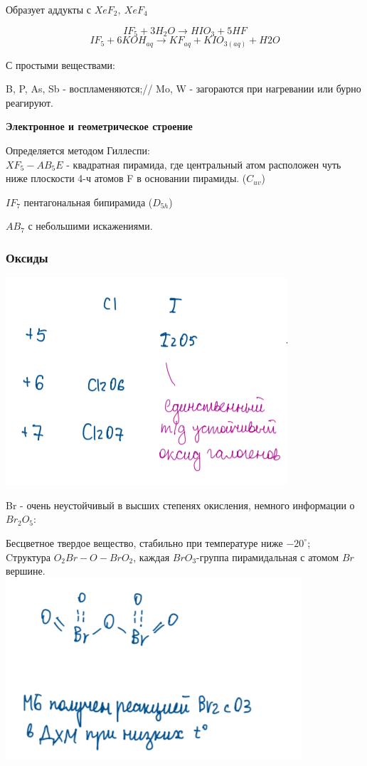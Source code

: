Образует аддукты с $XeF_2,\ XeF_4$

$$IF_5 + 3H_2O \rightarrow HIO_3 + 5HF$$
$$IF_5 + 6KOH_{aq}\rightarrow KF_{aq}+ KIO_{3(aq)} + H2O$$

С простыми веществами:

B, P, As, Sb - воспламеняются;//
Mo, W - загораются при нагревании или бурно реагируют.

\textbf{Электронное и геометрическое строение}

Определяется методом Гиллеспи:\\

$XF_5 - AB_5E$ - квадратная пирамида, где центральный атом расположен чуть ниже плоскости 4-ч атомов F в основании пирамиды. ($C_{uv}$)

$IF_7$ пентагональная бипирамида ($D_{5h}$)

$AB_7$ с небольшими искажениями.

\subsubsection*{Оксиды}
\includegraphics{images/5v1.png}

Br - очень неустойчивый в высших степенях окисления, немного информации о $Br_2O_5$:

Бесцветное твердое вещество, стабильно при температуре ниже $-20^{\circ}$;\\
Cтруктура $O_2Br-O-BrO_2$,  каждая $BrO_3$-группа пирамидальная с атомом $Br$  вершине.\\
\includegraphics{images/5v2.png}


